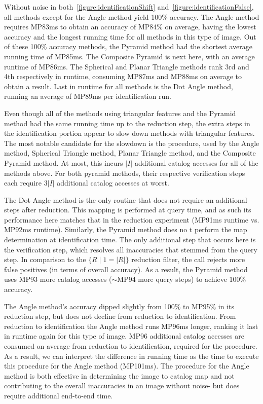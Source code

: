 Without noise in both~\autoref{figure:identificationShift} and~\autoref{figure:identificationFalse}, all methods except
for the Angle method yield 100\% accuracy.
The Angle method requires MP83ms to obtain an accuracy of MP84\% on average, having the lowest accuracy and the longest
running time for all methods in this type of image.
Out of these 100\% accuracy methods, the Pyramid method had the shortest average running time of MP85ms.
The Composite Pyramid is next here, with an average runtime of MP86ms.
The Spherical and Planar Triangle methods rank 3rd and 4th respectively in runtime, consuming MP87ms and MP88ms on
average to obtain a result.
Last in runtime for all methods is the Dot Angle method, running an average of MP89ms per identification run.

Even though all of the methods using triangular features and the Pyramid method had the same running time up to the
reduction step, the extra steps in the identification portion appear to slow down methods with triangular features.
The most notable candidate for the slowdown is the  procedure, used by the Angle method, Spherical Triangle
method, Planar Triangle method, and the Composite Pyramid method.
At most, this incurs $|I|$ additional catalog accesses for all of the methods above.
For both pyramid methods, their respective verification steps each require $3|I|$ additional catalog accesses at worst.

The Dot Angle method is the only routine that does not require an additional steps after reduction.
This mapping is performed at query time, and as such its performance here matches that in the reduction experiment
(MP91ms runtime vs. MP92ms runtime).
Similarly, the Pyramid method does no t perform the map determination at identification time.
The only additional step that occurs here is the verification step, which resolves all inaccuracies that stemmed
from the query step.
In comparison to the $\{ R \mid 1 = |R|\}$ reduction filter, the  call rejects more false positives
(in terms of overall accuracy).
As a result, the Pyramid method uses MP93 more catalog accesses ($\sim$MP94 more query steps) to achieve 100\% accuracy.

The Angle method's accuracy dipped slightly from 100\% to MP95\% in its reduction step, but does not decline from
reduction to identification.
From reduction to identification the Angle method runs MP96ms longer, ranking it last in runtime again for this
type of image.
MP96 additional catalog accesses are consumed on average from reduction to identification, required for the
 procedure.
As a result, we can interpret the difference in running time as the time to execute this procedure for the Angle method
(MP101ms).
The  procedure for the Angle method is both effective in determining the image to catalog map and not
contributing to the overall inaccuracies in an image without noise- but does require additional end-to-end time.

